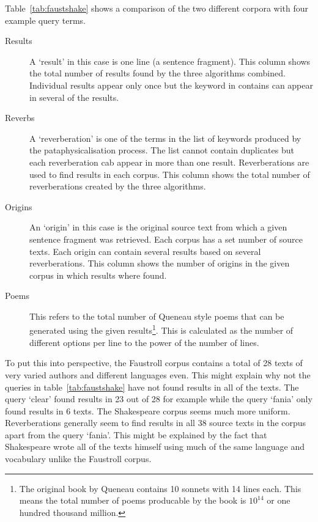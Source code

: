 Table~\ref{tab:faustshake} shows a comparison of the two different corpora with four example query terms.

\begin{description}
  \item[Results] A `result' in this case is one line (a sentence fragment). This column shows the total number of results found by the three algorithms combined. Individual results appear only once but the keyword in contains can appear in several of the results.
  \item[Reverbs] A `reverberation' is one of the terms in the list of keywords produced by the pataphysicalisation process. The list cannot contain duplicates but each reverberation cab appear in more than one result. Reverberations are used to find results in each corpus. This column shows the total number of reverberations created by the three algorithms.
  \item[Origins] An `origin' in this case is the original source text from which a given sentence fragment was retrieved. Each corpus has a set number of source texts. Each origin can contain several results based on several reverberations. This column shows the number of origins in the given corpus in which results where found.
  \item[Poems] This refers to the total number of Queneau style poems that can be generated using the given results\footnote{The original book by Queneau contains \num{10} sonnets with \num{14} lines each. This means the total number of poems producable by the book is $10^{14}$ or one hundred thousand million.}. This is calculated as the number of different options per line to the power of the number of lines.
\end{description}

To put this into perspective, the Faustroll corpus contains a total of \num{28} texts of very varied authors and different languages even. This might explain why not the queries in table~\ref{tab:faustshake} have not found results in all of the texts. The query `clear' found results in \num{23} out of \num{28} for example while the query `fania' only found results in \num{6} texts. The Shakespeare corpus seems much more uniform. Reverberations generally seem to find results in all \num{38} source texts in the corpus apart from the query `fania'. This might be explained by the fact that Shakespeare wrote all of the texts himself using much of the same language and vocabulary unlike the Faustroll corpus. 

